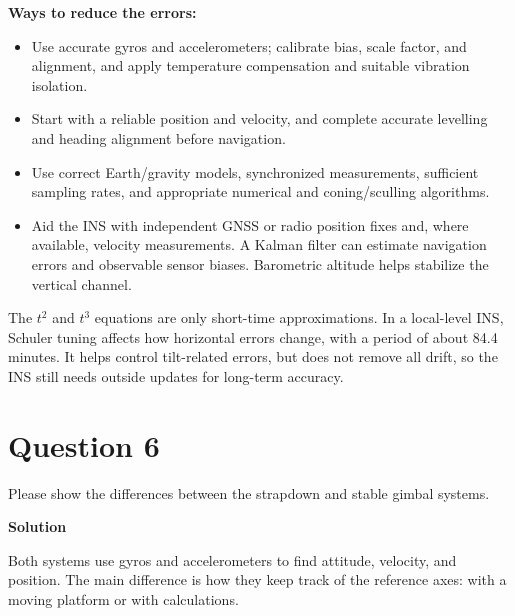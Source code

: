 \documentclass[12pt,a4paper]{article}
\begin{document}
\textbf{Ways to reduce the errors:}
\begin{itemize}[itemsep=0.15em]
\item Use accurate gyros and accelerometers; calibrate bias, scale factor, and alignment, and apply temperature compensation and suitable vibration isolation.
\item Start with a reliable position and velocity, and complete accurate levelling and heading alignment before navigation.
\item Use correct Earth/gravity models, synchronized measurements, sufficient sampling rates, and appropriate numerical and coning/sculling algorithms.
\item Aid the INS with independent GNSS or radio position fixes and, where available, velocity measurements. A Kalman filter can estimate navigation errors and observable sensor biases. Barometric altitude helps stabilize the vertical channel.
\end{itemize}

The $t^2$ and $t^3$ equations are only short-time approximations. In a local-level INS, Schuler tuning affects how horizontal errors change, with a period of about 84.4 minutes. It helps control tilt-related errors, but does not remove all drift, so the INS still needs outside updates for long-term accuracy.

\newpage
\section*{Question 6}
Please show the differences between the strapdown and stable gimbal systems.

\textbf{Solution}

Both systems use gyros and accelerometers to find attitude, velocity, and position. The main difference is how they keep track of the reference axes: with a moving platform or with calculations.

\begin{center}
\end{center}
\end{document}
